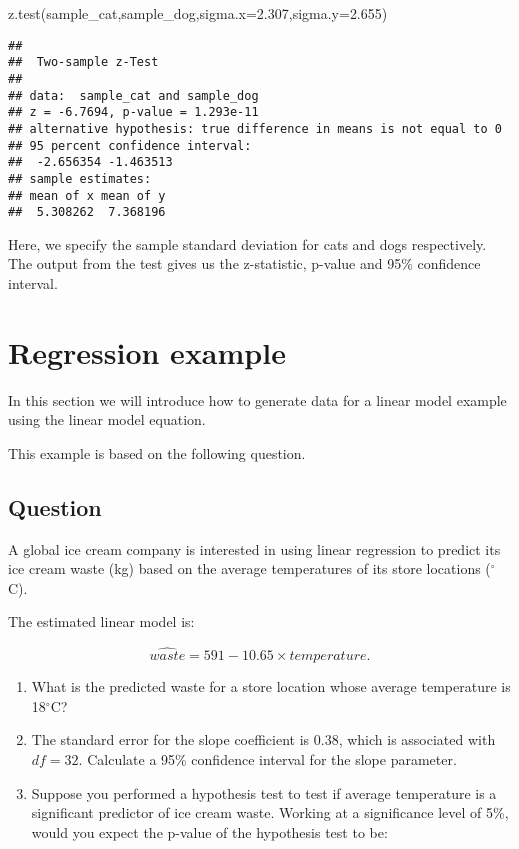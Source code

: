 \documentclass[
]{book}
\newenvironment{Shaded}{\begin{snugshade}}{\end{snugshade}}
\newcommand{\AttributeTok}[1]{\textcolor[rgb]{0.77,0.63,0.00}{#1}}
\newcommand{\FloatTok}[1]{\textcolor[rgb]{0.00,0.00,0.81}{#1}}
\newcommand{\FunctionTok}[1]{\textcolor[rgb]{0.00,0.00,0.00}{#1}}
\newcommand{\NormalTok}[1]{#1}
\begin{document}
\begin{Shaded}
\begin{Highlighting}[]
\FunctionTok{z.test}\NormalTok{(sample\_cat,sample\_dog,}\AttributeTok{sigma.x=}\FloatTok{2.307}\NormalTok{,}\AttributeTok{sigma.y=}\FloatTok{2.655}\NormalTok{)}
\end{Highlighting}
\end{Shaded}

\begin{verbatim}
## 
##  Two-sample z-Test
## 
## data:  sample_cat and sample_dog
## z = -6.7694, p-value = 1.293e-11
## alternative hypothesis: true difference in means is not equal to 0
## 95 percent confidence interval:
##  -2.656354 -1.463513
## sample estimates:
## mean of x mean of y 
##  5.308262  7.368196
\end{verbatim}

Here, we specify the sample standard deviation for cats and dogs respectively. The output from the test gives us the z-statistic, p-value and 95\% confidence interval.

\hypertarget{regression-example}{%
\chapter{Regression example}\label{regression-example}}

In this section we will introduce how to generate data for a linear model example using the linear model equation.

This example is based on the following question.

\hypertarget{question}{%
\section{Question}\label{question}}

A global ice cream company is interested in using linear regression to predict its ice cream waste (kg) based on the average temperatures of its store locations (\(^{\circ}\)C).

The estimated linear model is:

\[\hat{waste} = 591 - 10.65 \times temperature.\]

\begin{enumerate}
\def\labelenumi{\arabic{enumi}.}
\item
  What is the predicted waste for a store location whose average temperature is 18\(^{\circ}\)C?
\item
  The standard error for the slope coefficient is 0.38, which is associated with \(df=32\). Calculate a 95\% confidence interval for the slope parameter.
\item
  Suppose you performed a hypothesis test to test if average temperature is a significant predictor of ice cream waste. Working at a significance level of 5\%, would you expect the p-value of the hypothesis test to be:
\end{enumerate}
\end{document}
